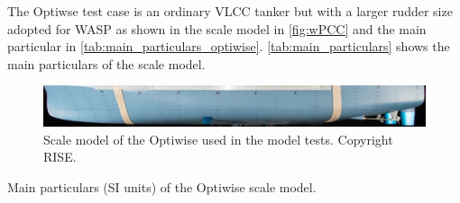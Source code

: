 The Optiwse test case is an ordinary VLCC tanker but with a larger rudder size adopted for WASP as shown in the scale model in  \autoref{fig:wPCC} and the main particular in \autoref{tab:main_particulars_optiwise}. 
\autoref{tab:main_particulars} shows the main particulars of the scale model. 
\begin{figure}[h]
    \centering
    \includegraphics[width=\columnwidth]{figures/5m2.jpg}
    \caption{Scale model of the Optiwise used in the model tests. Copyright RISE.}
    \label{fig:wPCC}
\end{figure}
\begin{table}[h]
    \centering
    \caption{Main particulars (SI units) of the Optiwise scale model.}
    \label{tab:main_particulars_optiwise}
\end{table}